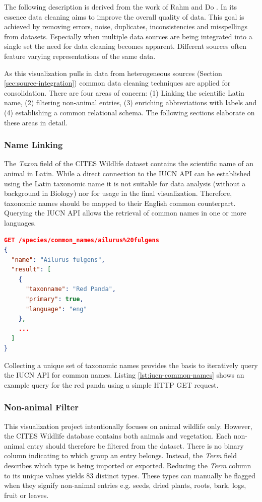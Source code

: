 The following description is derived from the work of Rahm and Do \cite{Rahm2000DataApproaches}.
In its essence data cleaning aims to improve the overall quality of data.
This goal is achieved by removing errors, noise, duplicates, inconsistencies and misspellings from datasets.
Especially when multiple data sources are being integrated into a single set the need for data cleaning becomes apparent.
Different sources often feature varying representations of the same data.

As this visualization pulls in data from heterogeneous sources (Section \ref{sec:source-integration}) common data cleaning techniques are applied for consolidation.
There are four areas of concern: (1) Linking the scientific Latin name, (2) filtering non-animal entries, (3) enriching abbreviations with labels and (4) establishing a common relational schema.
The following sections elaborate on these areas in detail.

\subsubsection{Name Linking}
The \textit{Taxon} field of the CITES Wildlife dataset contains the scientific name of an animal in Latin.
While a direct connection to the IUCN API can be established using the Latin taxonomic name it is not suitable for data analysis (without a background in Biology) nor for usage in the final visualization.
Therefore, taxonomic names should be mapped to their English common counterpart.
Querying the IUCN API allows the retrieval of common names in one or more languages.

\begin{lstlisting}[caption={Retrieving common names of the red panda from the IUCN API}, label={lst:iucn-common-names}, language=json]
GET /species/common_names/ailurus%20fulgens
{
  "name": "Ailurus fulgens",
  "result": [
    {
      "taxonname": "Red Panda",
      "primary": true,
      "language": "eng"
    },
    ...
  ]
}
\end{lstlisting}

Collecting a unique set of taxonomic names provides the basis to iteratively query the IUCN API for common names. Listing \ref{lst:iucn-common-names} shows an example query for the red panda using a simple HTTP GET request.

\subsubsection{Non-animal Filter}
This visualization project intentionally focuses on animal wildlife only.
However, the CITES Wildlife database contains both animals and vegetation.
Each non-animal entry should therefore be filtered from the dataset.
There is no binary column indicating to which group an entry belongs.
Instead, the \textit{Term} field describes which type is being imported or exported.
Reducing the \textit{Term} column to its unique values yields 83 distinct types.
These types can manually be flagged when they signify non-animal entries e.g. seeds, dried plants, roots, bark, logs, fruit or leaves.


